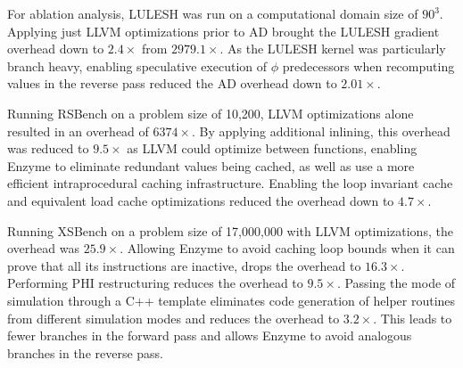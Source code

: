 {For ablation analysis, LULESH was run on a computational domain size of $90^{3}$. Applying just LLVM optimizations prior to AD brought the LULESH gradient overhead down to $2.4\times$ from $2979.1\times$. As the LULESH kernel was particularly branch heavy, enabling speculative execution of $\phi$ predecessors when recomputing values in the reverse pass reduced the AD overhead down to $2.01\times$.

Running RSBench on a problem size of 10,200, LLVM optimizations alone resulted in an overhead of $6374\times$. By applying additional inlining, this overhead was reduced to $9.5\times$ as LLVM could optimize between functions, enabling Enzyme to eliminate redundant values being cached, as well as use a more efficient intraprocedural caching infrastructure. Enabling the loop invariant cache and equivalent load cache optimizations reduced the overhead down to $4.7\times$.

Running XSBench on a problem size of 17,000,000 with LLVM optimizations, the overhead was $25.9\times$. Allowing Enzyme to avoid caching loop bounds when it can prove that all its instructions are inactive, drops the overhead to $16.3\times$. Performing PHI restructuring reduces the overhead to $9.5\times$. Passing the mode of simulation through a C++ template eliminates code generation of helper routines from different simulation modes and reduces the overhead to $3.2\times$. This leads to fewer branches in the forward pass and allows Enzyme to avoid analogous branches in the reverse pass.
}



